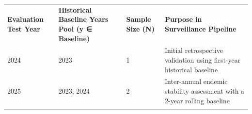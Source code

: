\documentclass[
]{article}
\newcounter{none} %
\begin{document}
{\def\LTcaptype{none} %
\begin{longtable}[]{@{}
  >{\raggedright\arraybackslash}p{}
  >{\raggedright\arraybackslash}p{}
  >{\raggedright\arraybackslash}p{}
  >{\raggedright\arraybackslash}p{}@{}}
\toprule\noalign{}
\begin{minipage}[b]{\linewidth}\raggedright
\textbf{Evaluation Test Year}
\end{minipage} & \begin{minipage}[b]{\linewidth}\raggedright
\textbf{Historical Baseline Years Pool (y ∈ Baseline)}
\end{minipage} & \begin{minipage}[b]{\linewidth}\raggedright
\textbf{Sample Size (N)}
\end{minipage} & \begin{minipage}[b]{\linewidth}\raggedright
\textbf{Purpose in Surveillance Pipeline}
\end{minipage} \\
\begin{minipage}[b]{\linewidth}\raggedright
2024
\end{minipage} & \begin{minipage}[b]{\linewidth}\raggedright
2023
\end{minipage} & \begin{minipage}[b]{\linewidth}\raggedright
1
\end{minipage} & \begin{minipage}[b]{\linewidth}\raggedright
Initial retrospective validation using first-year historical baseline
\end{minipage} \\
\begin{minipage}[b]{\linewidth}\raggedright
2025
\end{minipage} & \begin{minipage}[b]{\linewidth}\raggedright
2023, 2024
\end{minipage} & \begin{minipage}[b]{\linewidth}\raggedright
2
\end{minipage} & \begin{minipage}[b]{\linewidth}\raggedright
Inter-annual endemic stability assessment with a 2-year rolling baseline
\end{minipage} \\
\begin{minipage}[b]{\linewidth}\raggedright

\end{minipage}
\end{longtable}}
\end{document}
